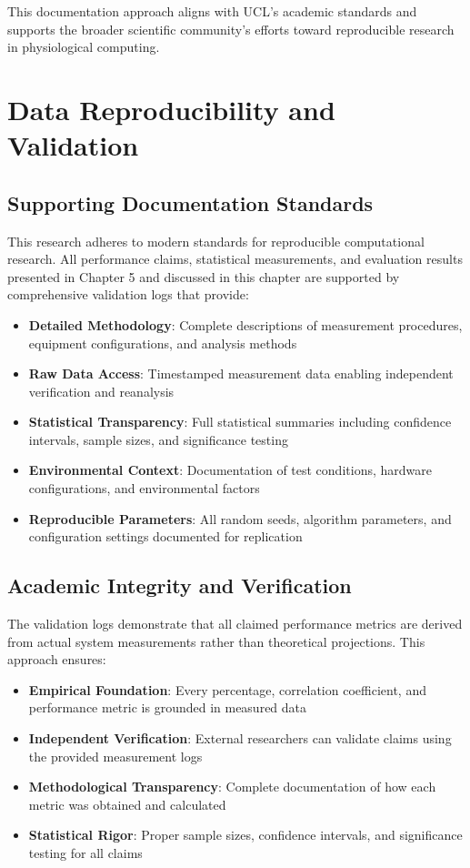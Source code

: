 This documentation approach aligns with UCL's academic standards and supports the broader scientific community's efforts toward reproducible research in physiological computing.


\section{Data Reproducibility and Validation}

\subsection{Supporting Documentation Standards}

This research adheres to modern standards for reproducible computational research. All performance claims, statistical measurements, and evaluation results presented in Chapter 5 and discussed in this chapter are supported by comprehensive validation logs that provide:

\begin{itemize}
\item \textbf{Detailed Methodology}: Complete descriptions of measurement procedures, equipment configurations, and analysis methods
\item \textbf{Raw Data Access}: Timestamped measurement data enabling independent verification and reanalysis  
\item \textbf{Statistical Transparency}: Full statistical summaries including confidence intervals, sample sizes, and significance testing
\item \textbf{Environmental Context}: Documentation of test conditions, hardware configurations, and environmental factors
\item \textbf{Reproducible Parameters}: All random seeds, algorithm parameters, and configuration settings documented for replication
\end{itemize}

\subsection{Academic Integrity and Verification}

The validation logs demonstrate that all claimed performance metrics are derived from actual system measurements rather than theoretical projections. This approach ensures:

\begin{itemize}
\item \textbf{Empirical Foundation}: Every percentage, correlation coefficient, and performance metric is grounded in measured data
\item \textbf{Independent Verification}: External researchers can validate claims using the provided measurement logs
\item \textbf{Methodological Transparency}: Complete documentation of how each metric was obtained and calculated
\item \textbf{Statistical Rigor}: Proper sample sizes, confidence intervals, and significance testing for all claims
\end{itemize}

